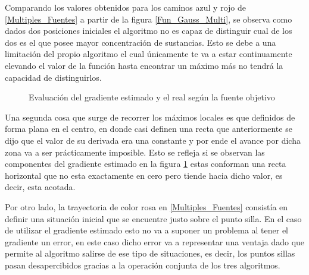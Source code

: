 Comparando los valores obtenidos para los caminos azul y rojo de \ref{Multiples_Fuentes} a partir de la figura \ref{Fun_Gauss_Multi}, se observa como dados dos posiciones iniciales el algoritmo no es capaz de distinguir cual de los dos es el que posee mayor concentración de sustancias. Esto se debe a una limitación del propio algoritmo el cual únicamente te va a estar continuamente elevando el valor de la función hasta encontrar un máximo más no tendrá la capacidad de distinguirlos.

\begin{figure}[H]
  \begin{center}
    \caption{Evaluación del gradiente estimado y el real según la fuente objetivo}
    \label{Comp_Multi_Gaussian}
  \end{center}
\end{figure}

Una segunda cosa que surge de recorrer los máximos locales es que  definidos de forma plana en el centro, en donde casi definen una recta que anteriormente se dijo que el valor de su derivada era una constante y por ende el avance por dicha zona va a ser prácticamente imposible. Esto se refleja si se observan las componentes del gradiente estimado en la figura \ref{Comp_Multi_Gaussian} estas conforman una recta horizontal que no esta exactamente en cero pero tiende hacia dicho valor, es decir, esta acotada.

Por otro lado, la trayectoria de color rosa en \ref{Multiples_Fuentes} consistía en definir una situación inicial que se encuentre justo sobre el punto silla. En el caso de utilizar el gradiente estimado esto no va a suponer un problema al tener el gradiente un error, en este caso dicho error va a representar una ventaja dado que permite al algoritmo salirse de ese tipo de situaciones, es decir, los puntos sillas pasan desapercibidos gracias a la operación conjunta de los tres algoritmos.





